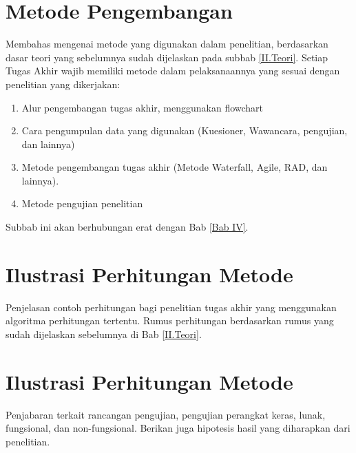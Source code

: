 \section{Metode Pengembangan} \label{III.Metode}
Membahas mengenai metode yang digunakan dalam penelitian, berdasarkan dasar teori yang sebelumnya sudah dijelaskan pada subbab \ref{II.Teori}. Setiap Tugas Akhir wajib memiliki metode dalam pelaksanaannya yang sesuai dengan penelitian yang dikerjakan: \par
\begin{enumerate}[noitemsep]
	\item Alur pengembangan tugas akhir, menggunakan flowchart
	\item Cara pengumpulan data yang digunakan (Kuesioner, Wawancara, pengujian, dan lainnya)
	\item Metode pengembangan tugas akhir (Metode Waterfall, Agile, RAD, dan lainnya).
	\item Metode pengujian penelitian
\end{enumerate}
Subbab ini akan berhubungan erat dengan Bab \ref{Bab IV}. \par

\section{Ilustrasi Perhitungan Metode} \label{III.Ilustrasi}
Penjelasan contoh perhitungan bagi penelitian tugas akhir yang menggunakan algoritma perhitungan tertentu. Rumus perhitungan berdasarkan rumus yang sudah dijelaskan sebelumnya di Bab \ref{II.Teori}. \par

\section{Ilustrasi Perhitungan Metode} \label{III.Rancang_Uji}
Penjabaran terkait rancangan pengujian, pengujian perangkat keras, lunak, fungsional, dan non-fungsional. Berikan juga hipotesis hasil yang diharapkan dari penelitian. \par
